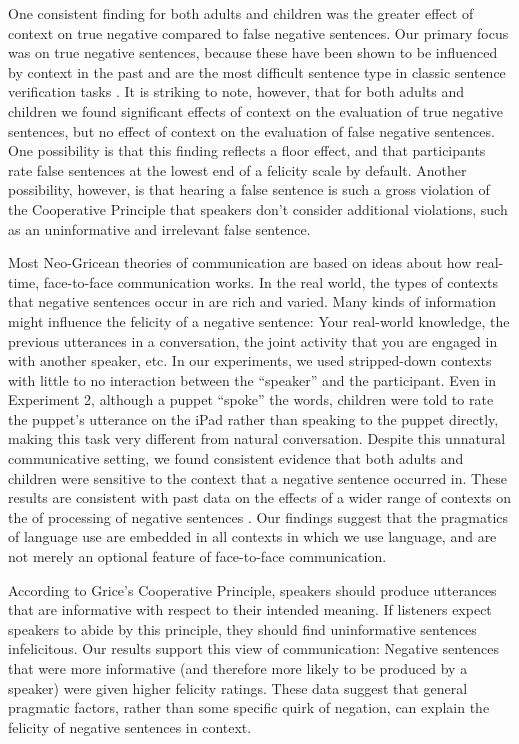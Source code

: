 \documentclass[man, noapacite]{apa2}
\begin{document}
One consistent finding for both adults and children was the greater effect of context on true negative compared to false negative sentences. Our primary focus was on true negative sentences, because these have been shown to be influenced by context in the past \cite{wason1965, glenberg1999, nordmeyer2014b} and are the most difficult sentence type in classic sentence verification tasks \cite{hclark1972}. It is striking to note, however, that for both adults and children we found significant effects of context on the evaluation of true negative sentences, but no effect of context on the evaluation of false negative sentences. One possibility is that this finding reflects a floor effect, and that participants rate false sentences at the lowest end of a felicity scale by default. Another possibility, however, is that hearing a false sentence is such a gross violation of the Cooperative Principle that speakers don't consider additional violations, such as an uninformative and irrelevant false sentence.

Most Neo-Gricean theories of communication are based on ideas about how real-time, face-to-face communication works. In the real world, the types of contexts that negative sentences occur in are rich and varied. Many kinds of information might influence the felicity of a negative sentence: Your real-world knowledge, the previous utterances in a conversation, the joint activity that you are engaged in with another speaker, etc. In our experiments, we used stripped-down contexts with little to no interaction between the ``speaker'' and the participant. Even in Experiment 2, although a puppet ``spoke'' the words, children were told to rate the puppet's utterance on the iPad rather than speaking to the puppet directly, making this task very different from natural conversation. Despite this unnatural communicative setting, we found consistent evidence that both adults and children were sensitive to the context that a negative sentence occurred in. These results are consistent with past data on the effects of a wider range of contexts on the of processing of negative sentences \cite{clark1976, wason1965, glenberg1999, nieuwland2008, dale2011, nordmeyer2014}. Our findings suggest that the pragmatics of language use are embedded in all contexts in which we use language, and are not merely an optional feature of face-to-face communication.

According to Grice's Cooperative Principle, speakers should produce utterances that are informative with respect to their intended meaning. If listeners expect speakers to abide by this principle, they should find uninformative sentences infelicitous. Our results support this view of communication: Negative sentences that were more informative (and therefore more likely to be produced by a speaker) were given higher felicity ratings. These data suggest that general pragmatic factors, rather than some specific quirk of negation, can explain the felicity of negative sentences in context.
\end{document}
